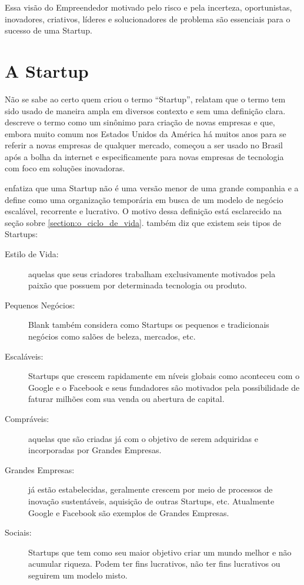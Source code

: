 Essa visão do Empreendedor motivado pelo risco e pela incerteza, oportunistas, inovadores, criativos, líderes e solucionadores de problema são essenciais para o sucesso de uma Startup.

\section{A Startup}
\label{section:as_startups}

Não se sabe ao certo quem criou o termo ``Startup'',  relatam que o termo tem sido usado de maneira ampla em diversos contexto e sem uma definição clara.  descreve o termo como um sinônimo para criação de novas empresas e que, embora muito comum nos Estados Unidos da América há muitos anos para se referir a novas empresas de qualquer mercado, começou a ser usado no Brasil após a bolha da internet e especificamente para novas empresas de tecnologia com foco em soluções inovadoras.

 enfatiza que uma Startup não é uma versão menor de uma grande companhia e a define como uma organização temporária em busca de um modelo de negócio escalável, recorrente e lucrativo. O motivo dessa definição está esclarecido na seção sobre \ref{section:o_ciclo_de_vida}.  também  diz que existem seis tipos de Startups: 

\begin{description}
	\item [Estilo de Vida:] aquelas que seus criadores trabalham exclusivamente motivados pela paixão que possuem por determinada tecnologia ou produto.

	\item [Pequenos Negócios:] Blank também considera como Startups os pequenos e tradicionais negócios como salões de beleza, mercados, etc.

	\item [Escaláveis:] Startups que crescem rapidamente em níveis globais como aconteceu com o Google e o Facebook e seus fundadores são motivados pela possibilidade de faturar milhões com sua venda ou abertura de capital.

	\item [Compráveis:] aquelas que são criadas já com o objetivo de serem adquiridas e incorporadas por Grandes Empresas.

	\item [Grandes Empresas:] já estão estabelecidas, geralmente crescem por meio de processos de inovação sustentáveis, aquisição de outras Startups, etc. Atualmente Google e Facebook são exemplos de Grandes Empresas.

	\item [Sociais:] Startups que tem como seu maior objetivo criar um mundo melhor e não acumular riqueza. Podem ter fins lucrativos, não ter fins lucrativos ou seguirem um modelo misto.
\end{description}

